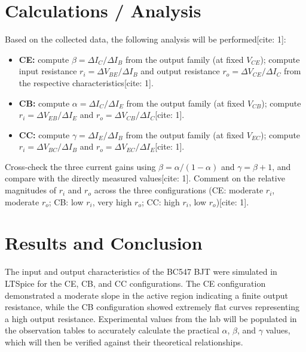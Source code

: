 \documentclass[12pt,a4paper]{article}
\begin{document}
\section{Calculations / Analysis}
Based on the collected data, the following analysis will be performed[cite: 1]:
\begin{itemize}
    \item \textbf{CE:} compute $\beta=\Delta I_C/\Delta I_B$ from the output family (at fixed $V_{CE}$); compute input resistance $r_i = \Delta V_{BE}/\Delta I_B$ and output resistance $r_o=\Delta V_{CE}/\Delta I_C$ from the respective characteristics[cite: 1].
    \item \textbf{CB:} compute $\alpha=\Delta I_C/\Delta I_E$ from the output family (at fixed $V_{CB}$); compute $r_i=\Delta V_{EB}/\Delta I_E$ and $r_o=\Delta V_{CB}/\Delta I_C$[cite: 1].
    \item \textbf{CC:} compute $\gamma=\Delta I_E/\Delta I_B$ from the output family (at fixed $V_{EC}$); compute $r_i=\Delta V_{BC}/\Delta I_B$ and $r_o=\Delta V_{EC}/\Delta I_E$[cite: 1].
\end{itemize}
Cross-check the three current gains using $\beta=\alpha/(1-\alpha)$ and $\gamma=\beta+1$, and compare with the directly measured values[cite: 1]. Comment on the relative magnitudes of $r_i$ and $r_o$ across the three configurations (CE: moderate $r_i$, moderate $r_o$; CB: low $r_i$, very high $r_o$; CC: high $r_i$, low $r_o$)[cite: 1].

\section{Results and Conclusion}
The input and output characteristics of the BC547 BJT were simulated in LTSpice for the CE, CB, and CC configurations. The CE configuration demonstrated a moderate slope in the active region indicating a finite output resistance, while the CB configuration showed extremely flat curves representing a high output resistance. Experimental values from the lab will be populated in the observation tables to accurately calculate the practical $\alpha$, $\beta$, and $\gamma$ values, which will then be verified against their theoretical relationships.
\end{document}
